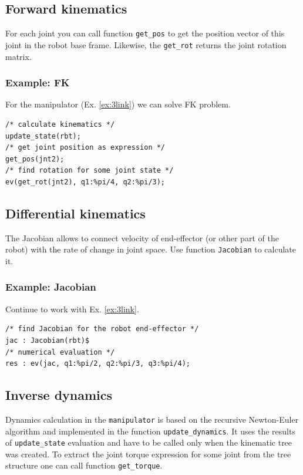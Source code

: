 \documentclass{article}
\begin{document}
\subsection{Forward kinematics}

For each joint you can call function \texttt{get\_pos} to get the position vector of this joint in the robot base frame. Likewise, the \texttt{get\_rot} returns the joint rotation matrix. 

\subsubsection{Example: FK}

For the manipulator (Ex. \ref{ex:3link}) we can solve FK problem. 

\begin{verbatim}
/* calculate kinematics */
update_state(rbt); 
/* get joint position as expression */
get_pos(jnt2); 
/* find rotation for some joint state */
ev(get_rot(jnt2), q1:%pi/4, q2:%pi/3);
\end{verbatim}

\subsection{Differential kinematics}

The Jacobian allows to connect velocity of end-effector (or other part of the robot) with the rate of change in joint space. Use function \texttt{Jacobian} to calculate it.  

\subsubsection{Example: Jacobian} 

Continue to work with Ex. \ref{ex:3link}.
\begin{verbatim}
/* find Jacobian for the robot end-effector */
jac : Jacobian(rbt)$
/* numerical evaluation */
res : ev(jac, q1:%pi/2, q2:%pi/3, q3:%pi/4);
\end{verbatim}

\subsection{Inverse dynamics}
\label{sec:dyn}

Dynamics calculation in the \texttt{manipulator} is based on the recursive Newton-Euler algorithm and implemented in the function \texttt{update\_dynamics}. It uses the results of \texttt{update\_state} evaluation and have to be called only when the kinematic tree was created. To extract the joint torque expression for some joint from the tree structure one can call function \texttt{get\_torque}.
\end{document}
